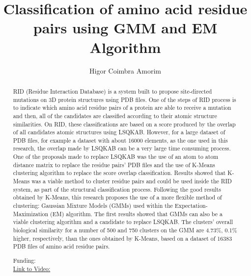 \documentclass[twoside]{article}
\title{\vspace{-15mm}\fontsize{24pt}{10pt}\selectfont\textbf{ Classification of amino acid residue pairs using GMM and EM Algorithm }} %
\author{ Higor Coimbra Amorim }
\affil{ CENTRO FEDERAL DE EDUCA\c{C}\~AO TECNOL\'OGICA DE MINAS GERAIS }
\date{}
\begin{document}
  
  
  \maketitle %
  
  
  \thispagestyle{fancy} %
  
  
  \begin{abstract}
  RID (Residue Interaction Database) is a system built to propose site-directed mutations on 3D protein structures using PDB files. One of the steps of RID process is to indicate which amino acid residue pairs of a protein are able to receive a mutation and then,  all of the candidates are classified according to their atomic structure similarities. On RID,  these classifications are based on a score produced by the overlap of all candidates atomic structures using LSQKAB. However,  for a large dataset of PDB files,  for example a dataset with about 16000 elements,  as the one used in this research,  the overlap made by LSQKAB can be a very large time consuming process. One of the proposals made to replace LSQKAB was the use of an atom to atom distance matrix to replace the residue pairs' PDB files and the use of K-Means clustering algorithm to replace the score overlap classification. Results showed that K-Means was a viable method to cluster residue pairs and could be used inside the RID system,  as part of the structural classification process. Following the good results obtained by K-Means,  this research proposes the use of a more flexible method of clustering: Gaussian Mixture Models (GMMs) used within the Expectation-Maximization (EM) algorithm. The first results showed that GMMs can also be a viable clustering algorithm and a candidate to replace LSQKAB. The clusters' overall biological similarity for a number of 500 and 750 clusters on the GMM are 4.73\%,  0.1\% higher,  respectively,  than the ones obtained by K-Means,  based on a dataset of 16383 PDB files of amino acid residue pairs.
  
  Funding:   \\
  \href{http://ab3c.org.br/xpress_pres2020/xmxp2020-302913.html}{Link to Video:}

  \end{abstract}
   
  
\end{document}
